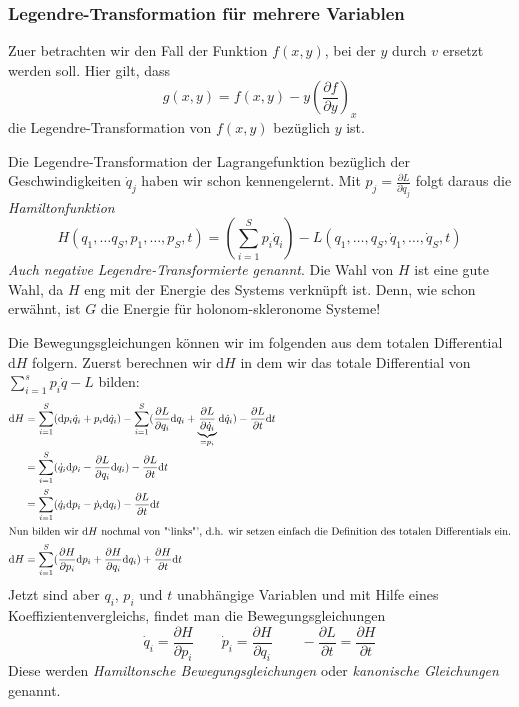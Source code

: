 \documentclass[oneside]{book}
\theoremstyle{definition}
\renewcommand{\d}{\mathrm d}
\newcommand{\md}{\d}
\begin{document}
\subsubsection{Legendre-Transformation für mehrere Variablen}
Zuer betrachten wir den Fall der Funktion $f(x,y)$, bei der $y$ durch $v$ ersetzt werden soll. Hier gilt, dass
\[g(x,y) = f(x,y) - y(\frac{\partial f}{\partial y})_x\]
die Legendre-Transformation von $f(x,y)$ bezüglich $y$ ist.

Die Legendre-Transformation der Lagrangefunktion bezüglich der Geschwindigkeiten $\dot q_j$ haben wir schon kennengelernt. Mit $p_j = \frac{\partial L}{\partial \dot q_j}$ folgt daraus die \emph{Hamiltonfunktion}
\[H(q_1,\ldots q_S,  p_1,\ldots, p_S,t) = (\sum\limits_{i=1}^S p_i \dot q_i) - L(q_1, \ldots,q_S, \dot q_1, \ldots, \dot q_S, t)\]
\textit{Auch negative Legendre-Transformierte genannt}.
Die Wahl von $H$ ist eine gute Wahl, da $H$ eng mit der Energie des Systems verknüpft ist. Denn, wie schon erwähnt, ist $G$ die Energie für holonom-skleronome Systeme!

Die Bewegungsgleichungen können wir im folgenden aus dem totalen Differential $\md H$ folgern.
Zuerst berechnen wir $\d H$ in dem wir das totale Differential von $\sum_{i=1}^s p_i \dot{q} - L$ bilden:
\begin{align*}
\md H &= \sum\limits_{i=1}^S (\md p_i \dot q_i + p_i \md \dot q_i) - \sum\limits_{i=1}^S (\frac{\partial L}{\partial q_i} \md q_i + \underbrace{\frac{\partial L}{\partial \dot q_i}}_{=p_i} \md \dot q_i) - \frac{\partial L}{\partial t} \md t\\
&=\sum\limits_{i=1}^S(\dot q_i \md p_i - \frac{\partial L}{\partial q_i}\md q_i) - \frac{\partial L}{\partial t}\md t\\
&=\sum\limits_{i=1}^S(\dot q_i \md p_i - \dot p_i\md q_i) - \frac{\partial L}{\partial t}\md t\\
\intertext{Nun bilden wir $\d H$ nochmal von "`links"', d.h. wir setzen einfach die Definition des totalen Differentials ein.}
\d H &= \sum\limits_{i=1}^S(\frac{\partial H}{\partial p_i}\md p_i + \frac{\partial H}{\partial q_i}\md q_i) + \frac{\partial H}{\partial t}\md t\\
\end{align*}
Jetzt sind aber $q_i$, $p_i$ und $t$ unabhängige Variablen und mit Hilfe eines Koeffizientenvergleichs, findet man die Bewegungsgleichungen
\[\dot q_i = \frac{\partial H}{\partial p_i}\qquad \dot p_i = \frac{\partial H}{\partial q_i} \qquad -\frac{\partial L}{\partial t} = \frac{\partial H}{\partial t}\]
Diese werden \emph{Hamiltonsche Bewegungsgleichungen} oder \emph{kanonische Gleichungen} genannt.
\end{document}
